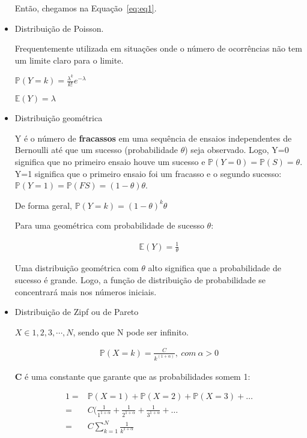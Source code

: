 \documentclass[11pt,a4paper]{book}
\begin{document}
\begin{itemize}
		Então, chegamos na Equação~\ref{eq:eq1}.
		
		\item Distribuição de Poisson.
		
		Frequentemente utilizada em situações onde o número de ocorrências não tem um limite claro para o limite.
		
		$\mathbb{P}(Y=k)=\frac{\lambda^k}{k!}e^{-\lambda}$
		
		$\mathbb{E}(Y)=\lambda$
		
		\item Distribuição geométrica
		
		Y é o número de \textbf{fracassos} em uma sequência de ensaios independentes de Bernoulli até que um sucesso (probabilidade $\theta$) seja observado.
		Logo, Y=0 significa que no primeiro ensaio houve um sucesso e $\mathbb{P}(Y=0)=\mathbb{P}(S)=\theta$.
		Y=1 significa que o primeiro ensaio foi um fracasso e o segundo sucesso: $\mathbb{P}(Y=1)=\mathbb{P}(FS)=(1-\theta)\theta$.
		
		De forma geral, $\mathbb{P}(Y=k)=(1-\theta)^k\theta$
		
		Para uma geométrica com probabilidade de sucesso $\theta$:
		
		\begin{eqnarray*}
			\mathbb{E}(Y)=\frac{1}{\theta}
		\end{eqnarray*}
		
		Uma distribuição geométrica com $\theta$ alto significa que a probabilidade de sucesso é grande.
		Logo, a função de distribuição de probabilidade se concentrará mais nos números iniciais.
		
		\item Distribuição de Zipf ou de Pareto
		
		$X\in {1,2,3,\cdots,N}$, sendo que N pode ser infinito.
		
		\begin{eqnarray*}
			\mathbb{P}(X=k)=\frac{C}{k^(1+\alpha)},~com~\alpha > 0
		\end{eqnarray*}
		
		\textbf{C} é uma constante que garante que as probabilidades somem 1:
		
		\begin{eqnarray*}
			1=&\mathbb{P}(X=1)+\mathbb{P}(X=2)+\mathbb{P}(X=3)+\ldots\\
			=&C(\frac{1}{1^{1+\alpha}}+\frac{1}{2^{1+\alpha}}+\frac{1}{3^{1+\alpha}}+\ldots\\
			=&C\sum_{k=1}^N\frac{1}{k^{1+\alpha}}
		\end{eqnarray*}
		

\end{itemize}
\end{document}
